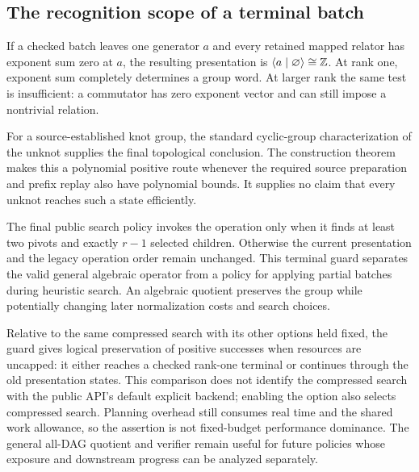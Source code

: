 \subsection{The recognition scope of a terminal batch}

If a checked batch leaves one generator $a$ and every retained mapped
relator has exponent sum zero at $a$, the resulting presentation is
$\langle a\mid\varnothing\rangle\cong\mathbb Z$. At rank one, exponent
sum completely determines a group word. At larger rank the same
test is insufficient: a commutator has zero exponent vector and can
still impose a nontrivial relation.

For a source-established knot group, the standard cyclic-group
characterization of the unknot supplies the final topological
conclusion. The construction theorem makes this a polynomial
positive route whenever the required source preparation and prefix
replay also have polynomial bounds. It supplies no claim that every
unknot reaches such a state efficiently.

The final public search policy invokes the operation only when it
finds at least two pivots and exactly $r-1$ selected children. Otherwise
the current presentation and the legacy operation order remain
unchanged. This terminal guard separates the valid general algebraic
operator from a policy for applying partial batches during heuristic
search. An algebraic quotient preserves the group while potentially
changing later normalization costs and search choices.

Relative to the same compressed search with its other options held
fixed, the guard gives logical preservation of positive successes
when resources are uncapped: it either reaches a checked rank-one
terminal or continues through the old presentation states. This
comparison does not identify the compressed search with the public
API's default explicit backend; enabling the option also selects
compressed search. Planning overhead still consumes real time and the shared
work allowance, so the assertion is not fixed-budget performance
dominance. The general all-DAG quotient and verifier remain useful
for future policies whose exposure and downstream progress can be
analyzed separately.
